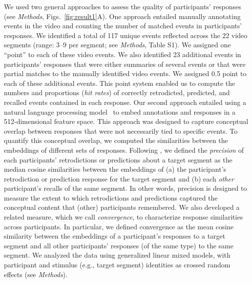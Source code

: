 \documentclass[10pt]{article}
\newcommand{\stimDescription}{S1}
\begin{document}
We used two general approaches to assess the quality of participants' responses
(see \textit{Methods}, Figs.~\ref{fig:result1}A). One approach entailed
manually annotating events in the video and counting the number of matched
events in participants' responses. We identified a total of 117 unique events
reflected across the 22 video segments (range: 3--9 per segment; see
\textit{Methods}, Table \stimDescription). We assigned one ``point'' to each of
these video events. We also identified 23 additional events in participants'
responses that were either summaries of several events or that were partial
matches to the manually identified video events. We assigned 0.5 point to each
of these additional events. This point system enabled us to compute the numbers
and proportions (\textit{hit rates}) of correctly retrodicted, predicted, and
recalled events contained in each response. Our second approach entailed using
a natural language processing model~\citep{CerEtal18} to embed annotations and
responses in a 512-dimensional feature space. This approach was designed to
capture conceptual overlap between responses that were not necessarily tied to
specific events. To quantify this conceptual overlap, we computed the
similarities between the embeddings of different sets of responses. Following
\cite{HeusEtal21}, we defined the \textit{precision} of each participants'
retrodictions or predictions about a target segment as the median cosine
similarities between the embeddings of (a) the participant's retrodiction or
prediction response for the target segment and (b) each \textit{other}
participant's recalls of the same segment. In other words, precision is
designed to measure the extent to which retrodictions and predictions captured
the conceptual content that (other) participants remembered. We also developed
a related measure, which we call \textit{convergence}, to characterize response
similarities across participants. In particular, we defined convergence as the
mean cosine similarity between the embeddings of a participant's responses to a
target segment and all other participants' responses (of the same type) to the
same segment. We analyzed the data using generalized linear mixed models, with
participant and stimulus (e.g., target segment) identities as crossed random
effects (see \textit{Methods}).
\end{document}
